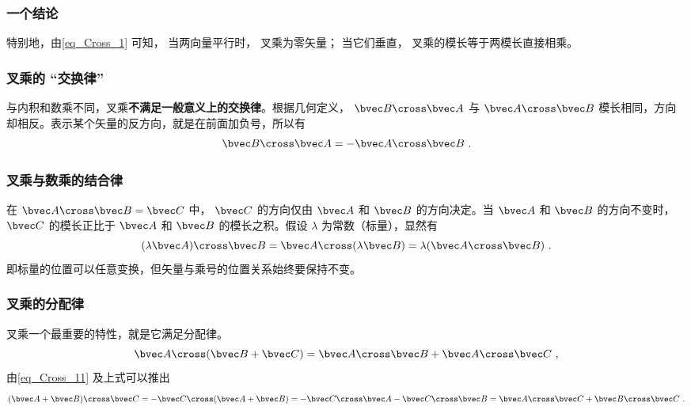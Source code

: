 \subsubsection{一个结论}
特别地，由\autoref{eq_Cross_1} 可知， 当两向量平行时， 叉乘为零矢量； 当它们垂直， 叉乘的模长等于两模长直接相乘。%

\subsubsection{叉乘的 “交换律”}
与内积和数乘不同，叉乘\textbf{不满足一般意义上的交换律}。根据几何定义， $\bvec B \cross \bvec A$ 与 $\bvec A \cross \bvec B$ 模长相同，方向却相反。表示某个矢量的反方向，就是在前面加负号，所以有
\begin{equation}\label{eq_Cross_11}
\bvec B \cross \bvec A = -\bvec A \cross \bvec B~.
\end{equation}

\subsubsection{叉乘与数乘的结合律}

在 $\bvec A \cross \bvec B = \bvec C$ 中， $\bvec C$ 的方向仅由 $\bvec A$ 和 $\bvec B$ 的方向决定。当 $\bvec A$ 和 $\bvec B$ 的方向不变时， $\bvec C$ 的模长正比于 $\bvec A$ 和 $\bvec B$ 的模长之积。假设 $\lambda $ 为常数（标量），显然有
\begin{equation}
(\lambda \bvec A) \cross \bvec B = \bvec A \cross (\lambda \bvec B) = \lambda (\bvec A \cross \bvec B)~.
\end{equation}
即标量的位置可以任意变换，但矢量与乘号的位置关系始终要保持不变。

\subsubsection{叉乘的分配律}

叉乘一个最重要的特性，就是它满足分配律。
\begin{equation}\label{eq_Cross_6}
\bvec A \cross (\bvec B +\bvec C) = \bvec A \cross \bvec B + \bvec A \cross \bvec C~,
\end{equation}
由\autoref{eq_Cross_11} 及上式可以推出
\begin{equation}\label{eq_Cross_7}
(\bvec A + \bvec B) \cross \bvec C =  - \bvec C \cross (\bvec A + \bvec B) =  - \bvec C \cross \bvec A - \bvec C \cross \bvec B = \bvec A \cross \bvec C + \bvec B \cross \bvec C~.
\end{equation}

